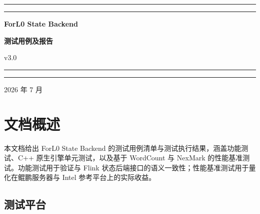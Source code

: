 \documentclass[a4paper,11pt]{article}
\newcommand{\project}{ForL0 State Backend}
\newcommand{\coverrule}{{\color{accent}\rule{\linewidth}{0.9pt}}}
\newcommand{\coverrulethin}{{\color{accent!55}\rule{\linewidth}{0.3pt}}}
\begin{document}
\begin{titlepage}
\thispagestyle{empty}
\centering
\vspace*{5.5cm}

\coverrule
\vspace{2pt}
\coverrulethin

\vspace{1.6cm}
{\sffamily\huge\bfseries\color{accent} \project\par}
\vspace{0.8cm}
{\sffamily\LARGE\bfseries 测试用例及报告\par}

\vspace{0.6cm}
{\sffamily\large v3.0\par}

\vspace{1.6cm}
\coverrulethin
\vspace{2pt}
\coverrule

\vfill

{\sffamily\large\color{accent!85} 2026 年 7 月\par}

\vspace{1.2cm}
\end{titlepage}

\pagestyle{plain}
\tableofcontents
\clearpage
{}
\setcounter{page}{1}
\pagestyle{fancy}

\section{文档概述}

本文档给出 \project{} 的测试用例清单与测试执行结果，涵盖功能测试、C++ 原生引擎单元测试，以及基于 WordCount 与 NexMark 的性能基准测试。功能测试用于验证与 Flink 状态后端接口的语义一致性；性能基准测试用于量化在鲲鹏服务器与 Intel 参考平台上的实际收益。

\subsection{测试平台}
\end{document}
